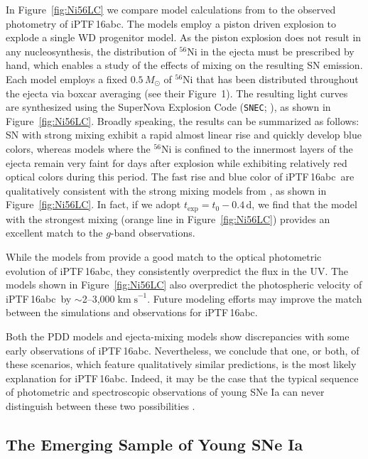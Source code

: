 \documentclass[twocolumn]{aastex61}
\newcommand{\sm}{M_\odot}
\newcommand{\abc}{iPTF\,16abc}
\begin{document}
In Figure~\ref{fig:Ni56LC} we compare model calculations from
\citet{2016ApJ...826...96P} to the observed photometry of \abc. The
\citeauthor{2016ApJ...826...96P} models employ a piston driven explosion to
explode a single WD progenitor model. As the piston explosion does not result
in any nucleosynthesis, the distribution of $^{56}$Ni in the ejecta must be
prescribed by hand, which enables a study of the effects of mixing on the
resulting SN emission. Each model employs a fixed $0.5\,\sm$ of $^{56}$Ni
that has been distributed throughout the ejecta via boxcar averaging (see
their Figure~1). The resulting light curves are synthesized using the
SuperNova Explosion Code (\texttt{SNEC}; \citealt{2015ApJ...814...63M}), as
shown in Figure~\ref{fig:Ni56LC}. Broadly speaking, the results can be
summarized as follows: SN with strong mixing exhibit a rapid almost linear
rise and quickly develop blue colors, whereas models where the $^{56}$Ni is
confined to the innermost layers of the ejecta remain very faint for days
after explosion while exhibiting relatively red optical colors during this
period. The fast rise and blue color of \abc\ are qualitatively consistent
with the strong mixing models from \citet{2016ApJ...826...96P}, as shown in
Figure~\ref{fig:Ni56LC}. In fact, if we adopt $t_\mathrm{exp} = t_0 - 0.4 \,
\mathrm{d}$, we find that the model with the strongest mixing (orange line in
Figure~\ref{fig:Ni56LC}) provides an excellent match to the $g$-band
observations.

While the models from \citet{2016ApJ...826...96P} provide a good match to the
optical photometric evolution of \abc, they consistently overpredict the flux
in the UV. The models shown in Figure~\ref{fig:Ni56LC} also overpredict the
photospheric velocity of \abc\ by $\sim$2--3,000$\; \mathrm{km \; s}^{-1}$.
Future modeling efforts may improve the match between the simulations and
observations for \abc.

Both the PDD models and ejecta-mixing models show discrepancies with some
early observations of \abc. Nevertheless, we conclude that one, or both, of
these scenarios, which feature qualitatively similar predictions, is the most
likely explanation for \abc. Indeed, it may be the case that the typical
sequence of photometric and spectroscopic observations of young SNe Ia can
never distinguish between these two possibilities \citep{2017arXiv170603613N}.

\subsection{The Emerging Sample of Young SNe Ia}
\end{document}
